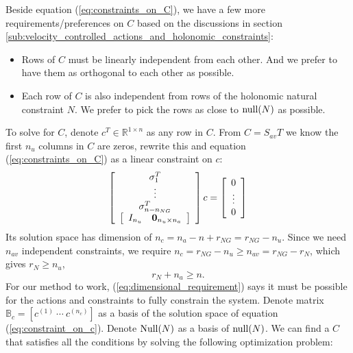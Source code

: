 Beside equation (\ref{eq:constraints_on_C}), we have a few more requirements/preferences on $C$ based on the discussions in section \ref{sub:velocity_controlled_actions_and_holonomic_constraints}:
\begin{itemize}
  \item Rows of $C$ must be linearly independent from each other. And we prefer to have them as orthogonal to each other as possible.
  \item Each row of $C$ is also independent from rows of the holonomic natural constraint $N$. We prefer to pick the rows as close to ${\rm null}(N)$ as possible.
\end{itemize}
To solve for $C$, denote $c^T\in \mathbb{R}^{1\times n}$ as any row in $C$. From $C=S_{av}T$ we know the first $n_u$ columns in $C$ are zeros, rewrite this and equation (\ref{eq:constraints_on_C}) as a linear constraint on $c$:
\begin{equation}
\label{eq:constraint_on_c}
  \left[ {\begin{array}{*{20}{c}}{\begin{array}{*{20}{c}}{\sigma _1^T}\\ \vdots \\{\sigma _{{n} - {n_{NG}}}^T}\end{array}}\\{\left[ {\begin{array}{*{20}{c}}{{I_{{n_u}}}}&{{{\bf{0}}_{{n_u} \times {n_a}}}}
  \end{array}} \right]}\end{array}} \right]c  = \left[ {\begin{array}{*{20}{c}}
  0\\ \vdots \\0\end{array}} \right]
\end{equation}
Its solution space has dimension of $n_c = n_a - n + r_{NG} = r_{NG} - n_u$. Since we need $n_{av}$ independent constraints, we require $n_c=r_{NG}-n_u \ge n_{av}=r_{NG}-r_N$, which gives $r_N\ge n_u $, \ie
\begin{equation}
\label{eq:dimensional_requirement}
r_N+n_a\ge n.
\end{equation}
For our method to work, (\ref{eq:dimensional_requirement}) says it must be possible for the actions and constraints to fully constrain the system.
Denote matrix $\mathbb{B}_c=[c^{(1)}\ \cdots\ c^{(n_c)}]$ as a basis of the solution space of equation (\ref{eq:constraint_on_c}). Denote ${\rm Null}(N)$ as a basis of ${\rm null}(N)$.
We can find a $C$ that satisfies all the conditions by solving the following optimization problem:
